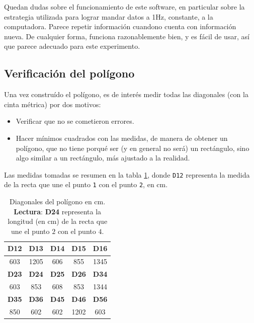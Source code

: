 \documentclass[spanish,12pt,a4paper,titlepage]{report}
\begin{document}
Quedan dudas sobre el funcionamiento de este software, en particular sobre la estrategia utilizada para lograr mandar datos a 1Hz, constante, a la computadora. Parece repetir información cuandono cuenta con información nueva. De cualquier forma, funciona razonablemente bien, y es fácil de usar, así que parece adecuado para este experimento.

\newpage
\subsection{Verificación del polígono}
\label{sec:verificacion-del-poligono}

Una vez construído el polígono, es de interés medir todas las diagonales (con la cinta métrica) por dos motivos:
\begin{itemize}
\item Verificar que no se cometieron errores.
\item Hacer mínimos cuadrados con las medidas, de manera de obtener un polígono, que no tiene porqué ser (y en general no será) un rectángulo, sino algo similar a un rectángulo, más ajustado a la realidad.
\end{itemize}

Las medidas tomadas se resumen en la tabla \ref{tab:diagonales-poligono}, donde \verb+D12+ representa la medida de la recta que une el punto \verb+1+ con el punto \verb+2+, en cm.

\begin{table}[H]
\begin{center}
\begin{tabular}{|c|c|c|c|c|}
\hline
\textbf{D12} & \textbf{D13} & \textbf{D14} & \textbf{D15} & \textbf{D16} \\
\hline
603 & 1205 & 606 & 855 & 1345 \\
\hline
\hline
\textbf{D23} & \textbf{D24} & \textbf{D25} & \textbf{D26} & \textbf{D34} \\
\hline
603 & 853 & 608 & 853 & 1344\\
\hline
\hline
\textbf{D35} & \textbf{D36} & \textbf{D45} & \textbf{D46} & \textbf{D56} \\
\hline
850 & 602 & 602 & 1202 & 603 \\
\hline
\end{tabular}
\caption{Diagonales del polígono en cm.\\\textbf{Lectura}: \textbf{D24} representa la longitud (en cm) de la recta que une el punto $2$ con el punto $4$.}
\label{tab:diagonales-poligono}
\end{center}
\end{table}
\end{document}
